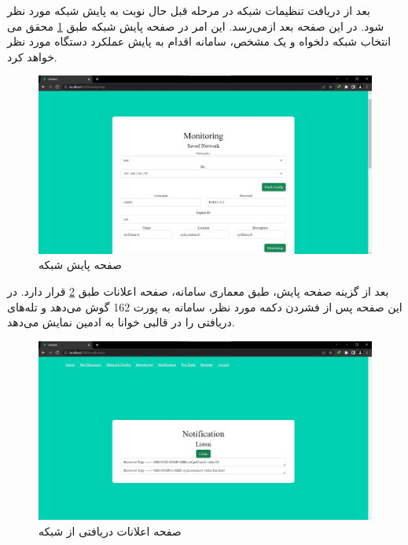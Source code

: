 بعد از دریافت تنظیمات شبکه در مرحله قبل حال نوبت به پایش شبکه مورد نظر می‌رسد. این امر در صفحه پایش شبکه طبق \cref{fig.18} محقق می‌‎شود. در این صفحه بعد از انتخاب شبکه دلخواه و یک  مشخص، سامانه اقدام به پایش عملکرد دستگاه مورد نظر خواهد کرد.


\begin{figure}[!h]
    \centering\includegraphics[scale=.38]{./monitoring}
    \caption{صفحه پایش شبکه}\label{fig.18}
\end{figure}



بعد از گزینه صفحه پایش، طبق معماری سامانه، صفحه اعلانات طبق \cref{fig.19} قرار دارد. در این صفحه پس از فشردن دکمه مورد نظر، سامانه به پورت 162 گوش می‌دهد و تله‌های دریافتی را در قالبی خوانا به ادمین نمایش می‌دهد.

\begin{figure}[!h]
    \centering\includegraphics[scale=.38]{./notification}
    \caption{صفحه اعلانات دریافتی از شبکه}\label{fig.19}
\end{figure}



